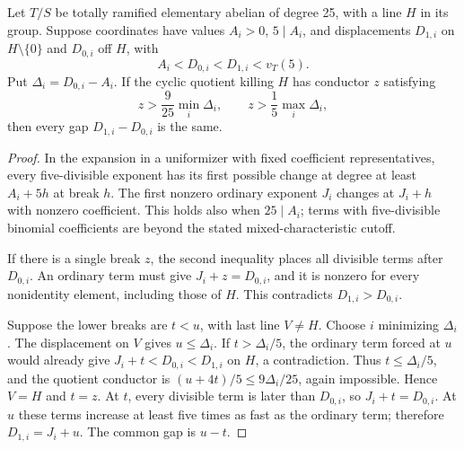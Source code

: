 \begin{lemma}\label{lem:large-gap}
Let $T/S$ be totally ramified elementary abelian of degree 25, with a line $H$ in its group. Suppose coordinates have values $A_i>0$, $5\mid A_i$, and displacements $D_{1,i}$ on $H\setminus\{0\}$ and $D_{0,i}$ off $H$, with
\[
                    A_i<D_{0,i}<D_{1,i}<v_T(5).
\]
Put $\Delta_i=D_{0,i}-A_i$. If the cyclic quotient killing $H$ has conductor $z$ satisfying
\[
 z>\frac9{25}\min_i\Delta_i,\qquad
 z>\frac15\max_i\Delta_i,
\]
then every gap $D_{1,i}-D_{0,i}$ is the same.
\end{lemma}
\begin{proof}
In the expansion in a uniformizer with fixed coefficient representatives, every five-divisible exponent has its first possible change at degree at least $A_i+5h$ at break $h$. The first nonzero ordinary exponent $J_i$ changes at $J_i+h$ with nonzero coefficient. This holds also when $25\mid A_i$; terms with five-divisible binomial coefficients are beyond the stated mixed-characteristic cutoff.

If there is a single break $z$, the second inequality places all divisible terms after $D_{0,i}$. An ordinary term must give $J_i+z=D_{0,i}$, and it is nonzero for every nonidentity element, including those of $H$. This contradicts $D_{1,i}>D_{0,i}$.

Suppose the lower breaks are $t<u$, with last line $V\ne H$. Choose $i$ minimizing $\Delta_i$. The displacement on $V$ gives $u\le\Delta_i$. If $t>\Delta_i/5$, the ordinary term forced at $u$ would already give $J_i+t<D_{0,i}<D_{1,i}$ on $H$, a contradiction. Thus $t\le\Delta_i/5$, and the quotient conductor is $(u+4t)/5\le9\Delta_i/25$, again impossible. Hence $V=H$ and $t=z$. At $t$, every divisible term is later than $D_{0,i}$, so $J_i+t=D_{0,i}$. At $u$ these terms increase at least five times as fast as the ordinary term; therefore $D_{1,i}=J_i+u$. The common gap is $u-t$.
\end{proof}


